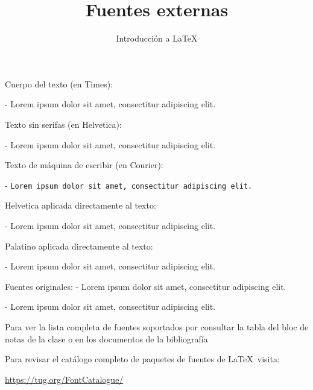 \documentclass[12pt,letterpaper]{article}
\title{Fuentes externas}
\author{Introducción a LaTeX}
\begin{document}
\maketitle

Cuerpo del texto (en Times):

- Lorem ipsum dolor sit amet, consectitur adipiscing elit.

Texto sin serifas (en Helvetica):

- \textsf{Lorem ipsum dolor sit amet, consectitur adipiscing elit.}

Texto de máquina de escribir (en Courier):

- \texttt{Lorem ipsum dolor sit amet, consectitur adipiscing elit.}

\vspace{0.3cm}

Helvetica aplicada directamente al texto:

\selectfont
- Lorem ipsum dolor sit amet, consectitur adipiscing elit.


Palatino aplicada directamente al texto: 

\selectfont
- Lorem ipsum dolor sit amet, consectitur adipiscing elit.

\vspace{0.3cm}

Fuentes originales:
\selectfont
- {Lorem ipsum dolor sit amet, consectitur adipiscing elit.}

\selectfont
- {Lorem ipsum dolor sit amet, consectitur adipiscing elit.}

Para ver la lista completa de fuentes soportados por \fontfamily consultar la tabla del bloc de notas de la clase o en los documentos de la bibliografía

\vspace{0.3cm}

Para revisar el catálogo completo de paquetes de fuentes de \LaTeX \ visita: 

\url{https://tug.org/FontCatalogue/}
\end{document}
